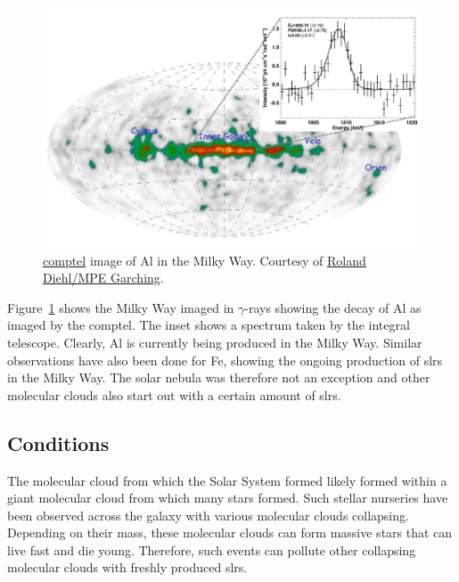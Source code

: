 \begin{figure}[tb]
    \centering
    \includegraphics[width=\textwidth]{graphics/solar_system_slrs/al26_galaxy}
    \caption{\href{https://heasarc.gsfc.nasa.gov/docs/cgro/cgro/comptel.html}{\acs{comptel}} image of Al in the Milky Way. Courtesy of \href{https://www2011.mpe.mpg.de/gamma/science/lines/26Al/26Al.html}{Roland Diehl/MPE Garching}.}
    \label{fig:solar_system_slrs:comptel_al26_gamma-ray}
\end{figure}
Figure~\ref{fig:solar_system_slrs:comptel_al26_gamma-ray} shows the Milky Way imaged in $\gamma$-rays showing the decay of Al as imaged by the \acf{comptel}. The inset shows a spectrum taken by the \acf{integral} telescope. Clearly, Al is currently being produced in the Milky Way. Similar observations have also been done for Fe, showing the ongoing production of \acp{slr} in the Milky Way. The solar nebula was therefore not an exception and other molecular clouds also start out with a certain amount of \acp{slr}.

\subsection{Conditions}

The molecular cloud from which the Solar System formed likely formed within a giant molecular cloud from which many stars formed. Such stellar nurseries have been observed across the galaxy with various molecular clouds collapsing. Depending on their mass, these molecular clouds can form massive stars that can live fast and die young. Therefore, such events can pollute other collapsing molecular clouds with freshly produced \acp{slr}. 

